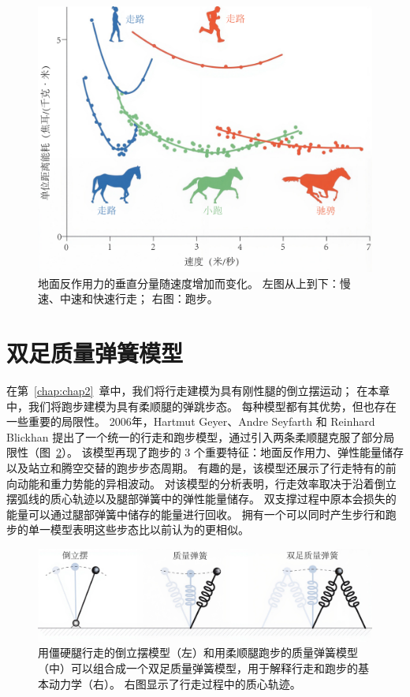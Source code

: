 \begin{figure}[!htb]
	\centering
	\includegraphics[width=0.85\linewidth]{chap3/3_18}
	\caption{地面反作用力的垂直分量随速度增加而变化。
		左图从上到下：慢速、中速和快速行走；
		右图：跑步\cite{alexander1984walking}。 \label{fig:3_18}}
\end{figure}


\section{双足质量弹簧模型}

在第~\ref{chap:chap2}~章中，我们将行走建模为具有刚性腿的倒立摆运动；
在本章中，我们将跑步建模为具有柔顺腿的弹跳步态。
每种模型都有其优势，但也存在一些重要的局限性。
2006年，Hartmut Geyer、Andre Seyfarth 和 Reinhard Blickhan 提出了一个统一的行走和跑步模型，通过引入两条柔顺腿克服了部分局限性（图~\ref{fig:3_19}）。
该模型再现了跑步的 3 个重要特征：地面反作用力、弹性能量储存以及站立和腾空交替的跑步步态周期。
有趣的是，该模型还展示了行走特有的前向动能和重力势能的异相波动。
对该模型的分析表明，行走效率取决于沿着倒立摆弧线的质心轨迹以及腿部弹簧中的弹性能量储存。
双支撑过程中原本会损失的能量可以通过腿部弹簧中储存的能量进行回收。
拥有一个可以同时产生步行和跑步的单一模型表明这些步态比以前认为的更相似。

\begin{figure}[!htb]
	\centering
	\includegraphics[width=1.0\linewidth]{chap3/3_19}
	\caption{用僵硬腿行走的倒立摆模型（左）和用柔顺腿跑步的质量弹簧模型（中）可以组合成一个双足质量弹簧模型，用于解释行走和跑步的基本动力学（右）。
		右图显示了行走过程中的质心轨迹\cite{geyer2006compliant}。 \label{fig:3_19}}
\end{figure}



